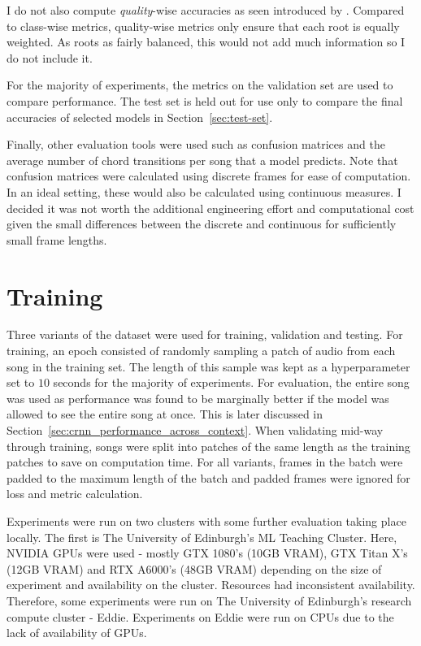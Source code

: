 I do not also compute \emph{quality}-wise accuracies as seen introduced by \citet{CurriculumLearning}. Compared to class-wise metrics, quality-wise metrics only ensure that each root is equally weighted. As roots as fairly balanced, this would not add much information so I do not include it.

For the majority of experiments, the metrics on the validation set are used to compare performance. The test set is held out for use only to compare the final accuracies of selected models in Section~\ref{sec:test-set}.

Finally, other evaluation tools were used such as confusion matrices and the average number of chord transitions per song that a model predicts. Note that confusion matrices were calculated using discrete frames for ease of computation. In an ideal setting, these would also be calculated using continuous measures. I decided it was not worth the additional engineering effort and computational cost given the small differences between the discrete and continuous for sufficiently small frame lengths.

\section{Training}\label{sec:training}

Three variants of the dataset were used for training, validation and testing. For training, an epoch consisted of randomly sampling a patch of audio from each song in the training set. The length of this sample was kept as a hyperparameter set to $10$ seconds for the majority of experiments. For evaluation, the entire song was used as performance was found to be marginally better if the model was allowed to see the entire song at once. This is later discussed in Section~\ref{sec:crnn_performance_across_context}. When validating mid-way through training, songs were split into patches of the same length as the training patches to save on computation time. For all variants, frames in the batch were padded to the maximum length of the batch and padded frames were ignored for loss and metric calculation.

Experiments were run on two clusters with some further evaluation taking place locally. The first is The University of Edinburgh's ML Teaching Cluster. Here, NVIDIA GPUs were used - mostly GTX 1080's (10GB VRAM), GTX Titan X's (12GB VRAM) and RTX A6000's (48GB VRAM) depending on the size of experiment and availability on the cluster. Resources had inconsistent availability. Therefore, some experiments were run on The University of Edinburgh's research compute cluster - Eddie. Experiments on Eddie were run on CPUs due to the lack of availability of GPUs. 

